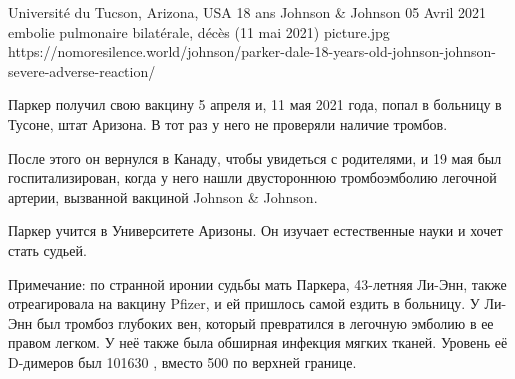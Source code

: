           {Université du Tucson, Arizona, USA}
          {18 ans}
          {Johnson \& Johnson}
          {05 Avril 2021}
          {embolie pulmonaire bilatérale, décès (11 mai 2021)}
          {picture.jpg}
          {https://nomoresilence.world/johnson/parker-dale-18-years-old-johnson-johnson-severe-adverse-reaction/}
          {

Паркер получил свою вакцину 5 апреля и, 11 мая 2021 года, попал в больницу в
Тусоне, штат Аризона. В тот раз у него не проверяли наличие тромбов.

После этого он вернулся в Канаду, чтобы увидеться с родителями, и 19 мая был
госпитализирован, когда у него нашли двустороннюю тромбоэмболию легочной
артерии, вызванной вакциной Johnson \& Johnson.

Паркер учится в Университете Аризоны. Он изучает естественные науки и хочет
стать судьей.

Примечание: по странной иронии судьбы мать Паркера, 43-летняя Ли-Энн, также
отреагировала на вакцину Pfizer, и ей пришлось самой ездить в больницу. У Ли-Энн
был тромбоз глубоких вен, который превратился в легочную эмболию в ее правом
легком. У неё также была обширная инфекция мягких тканей. Уровень её D-димеров
был 101630 , вместо 500 по верхней границе.

}
